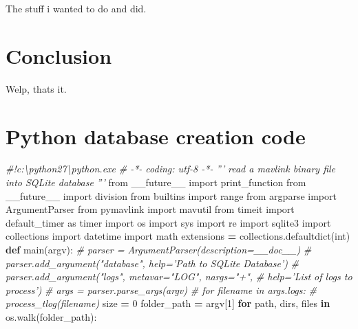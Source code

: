 \documentclass[12pt,oneside]{reedthesis}
\newenvironment{Shaded}{\begin{snugshade}}{\end{snugshade}}
\newcommand{\KeywordTok}[1]{\textcolor[rgb]{0.13,0.29,0.53}{\textbf{#1}}}
\newcommand{\DecValTok}[1]{\textcolor[rgb]{0.00,0.00,0.81}{#1}}
\newcommand{\ImportTok}[1]{#1}
\newcommand{\CommentTok}[1]{\textcolor[rgb]{0.56,0.35,0.01}{\textit{#1}}}
\newcommand{\ControlFlowTok}[1]{\textcolor[rgb]{0.13,0.29,0.53}{\textbf{#1}}}
\newcommand{\OperatorTok}[1]{\textcolor[rgb]{0.81,0.36,0.00}{\textbf{#1}}}
\newcommand{\BuiltInTok}[1]{#1}
\newcommand{\NormalTok}[1]{#1}
\theoremstyle{definition}
\theoremstyle{definition}
\theoremstyle{definition}
\theoremstyle{remark}
\begin{document}
The stuff i wanted to do and did.

\chapter*{Conclusion}\label{conclusion}

Welp, thats it.

\appendix

\chapter{Python database creation
code}\label{python-database-creation-code}
\begin{Shaded}
\begin{Highlighting}[]
\CommentTok{#!c:\textbackslash{}python27\textbackslash{}python.exe}
\CommentTok{# -*- coding: utf-8 -*-}
\CommentTok{'''}
\CommentTok{read a mavlink binary file into SQLite database}
\CommentTok{'''}
\ImportTok{from}\NormalTok{ __future__ }\ImportTok{import}\NormalTok{ print_function}
\ImportTok{from}\NormalTok{ __future__ }\ImportTok{import}\NormalTok{ division}
\ImportTok{from}\NormalTok{ builtins   }\ImportTok{import} \BuiltInTok{range}
\ImportTok{from}\NormalTok{ argparse   }\ImportTok{import}\NormalTok{ ArgumentParser}
\ImportTok{from}\NormalTok{ pymavlink  }\ImportTok{import}\NormalTok{ mavutil}
\ImportTok{from}\NormalTok{ timeit     }\ImportTok{import}\NormalTok{ default_timer }\ImportTok{as}\NormalTok{ timer}
\ImportTok{import}\NormalTok{ os}
\ImportTok{import}\NormalTok{ sys}
\ImportTok{import}\NormalTok{ re}
\ImportTok{import}\NormalTok{ sqlite3}
\ImportTok{import}\NormalTok{ collections}
\ImportTok{import}\NormalTok{ datetime}
\ImportTok{import}\NormalTok{ math}
\NormalTok{extensions }\OperatorTok{=}\NormalTok{ collections.defaultdict(}\BuiltInTok{int}\NormalTok{)}
\KeywordTok{def}\NormalTok{ main(argv):}
    \CommentTok{# parser = ArgumentParser(description=__doc__)}
    \CommentTok{# parser.add_argument("database", help='Path to SQLite Database')}
    \CommentTok{# parser.add_argument("logs", metavar="LOG", nargs="+", }
      \CommentTok{# help='List of logs to process')}
    \CommentTok{# args = parser.parse_args(argv)}
    \CommentTok{# for filename in args.logs:}
    \CommentTok{#     process_tlog(filename)}
\NormalTok{    size }\OperatorTok{=} \DecValTok{0}
\NormalTok{    folder_path }\OperatorTok{=}\NormalTok{ argv[}\DecValTok{1}\NormalTok{]}
    \ControlFlowTok{for}\NormalTok{ path, dirs, files }\KeywordTok{in}\NormalTok{ os.walk(folder_path):}

\end{Highlighting}
\end{Shaded}
\end{document}
